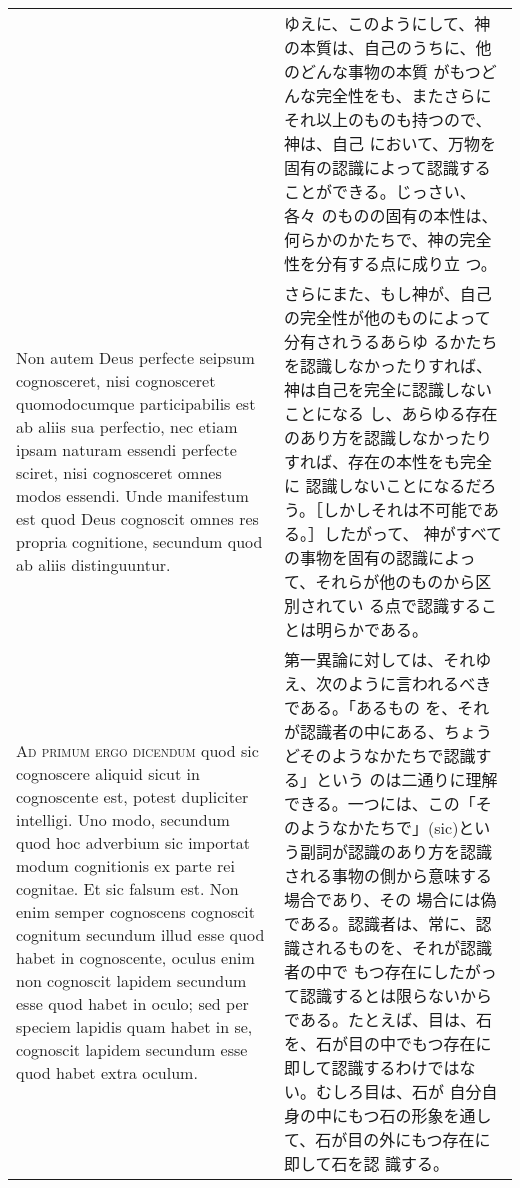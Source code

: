 \documentclass[10pt]{jsarticle} %
\begin{document}
\begin{longtable}{p{21em}p{21em}}
&

ゆえに、このようにして、神の本質は、自己のうちに、他のどんな事物の本質
がもつどんな完全性をも、またさらにそれ以上のものも持つので、神は、自己
において、万物を固有の認識によって認識することができる。じっさい、各々
のものの固有の本性は、何らかのかたちで、神の完全性を分有する点に成り立
つ。


\\


Non autem Deus perfecte seipsum cognosceret, nisi cognosceret
quomodocumque participabilis est ab aliis sua perfectio, nec etiam
ipsam naturam essendi perfecte sciret, nisi cognosceret omnes modos
essendi. Unde manifestum est quod Deus cognoscit omnes res propria
cognitione, secundum quod ab aliis distinguuntur.


&

さらにまた、もし神が、自己の完全性が他のものによって分有されうるあらゆ
るかたちを認識しなかったりすれば、神は自己を完全に認識しないことになる
し、あらゆる存在のあり方を認識しなかったりすれば、存在の本性をも完全に
認識しないことになるだろう。［しかしそれは不可能である。］したがって、
神がすべての事物を固有の認識によって、それらが他のものから区別されてい
る点で認識することは明らかである。


\\


{\scshape Ad primum ergo dicendum} quod sic cognoscere aliquid sicut
in cognoscente est, potest dupliciter intelligi. Uno modo, secundum
quod hoc adverbium sic importat modum cognitionis ex parte rei
cognitae. Et sic falsum est. Non enim semper cognoscens cognoscit
cognitum secundum illud esse quod habet in cognoscente, oculus enim
non cognoscit lapidem secundum esse quod habet in oculo; sed per
speciem lapidis quam habet in se, cognoscit lapidem secundum esse quod
habet extra oculum.

&

第一異論に対しては、それゆえ、次のように言われるべきである。「あるもの
を、それが認識者の中にある、ちょうどそのようなかたちで認識する」という
のは二通りに理解できる。一つには、この「そのようなかたちで」(sic)とい
う副詞が認識のあり方を認識される事物の側から意味する場合であり、その
場合には偽である。認識者は、常に、認識されるものを、それが認識者の中で
もつ存在にしたがって認識するとは限らないからである。たとえば、目は、石
を、石が目の中でもつ存在に即して認識するわけではない。むしろ目は、石が
自分自身の中にもつ石の形象を通して、石が目の外にもつ存在に即して石を認
識する。


\\




\end{longtable}
\end{document}
